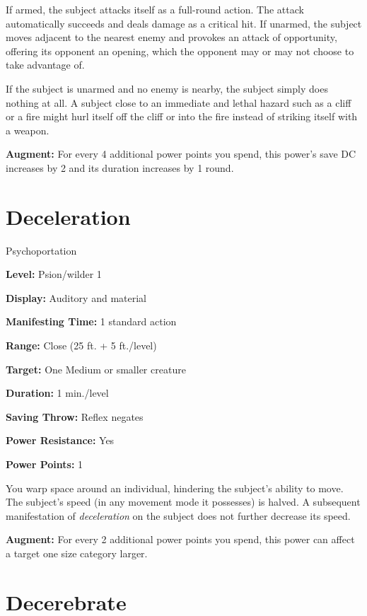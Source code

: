 \documentclass{article}
\begin{document}
If armed, the subject attacks itself as a full-round action. The attack automatically 
succeeds and deals damage as a critical hit. If unarmed, the subject moves adjacent 
to the nearest enemy and provokes an attack of opportunity, offering its opponent 
an opening, which the opponent may or may not choose to take advantage of.

If the subject is unarmed and no enemy is nearby, the subject simply does nothing 
at all. A subject close to an immediate and lethal hazard such as a cliff or a 
fire might hurl itself off the cliff or into the fire instead of striking itself 
with a weapon.

\textbf{Augment:} For every 4 additional power points you spend, this power's save 
DC increases by 2 and its duration increases by 1 round.

\vspace{12pt}
\section*{Deceleration}

Psychoportation

\textbf{Level:} Psion/wilder 1

\textbf{Display:} Auditory and material

\textbf{Manifesting Time:} 1 standard action

\textbf{Range:} Close (25 ft. + 5 ft./level)

\textbf{Target:} One Medium or smaller creature

\textbf{Duration:} 1 min./level

\textbf{Saving Throw:} Reflex negates

\textbf{Power Resistance:} Yes

\textbf{Power Points:} 1

You warp space around an individual, hindering the subject's ability to move. The 
subject's speed (in any movement mode it possesses) is halved. A subsequent manifestation 
of \textit{deceleration }on the subject does not further decrease its speed.

\textbf{Augment:} For every 2 additional power points you spend, this power can 
affect a target one size category larger.

\vspace{12pt}
\section*{Decerebrate}
\end{document}

